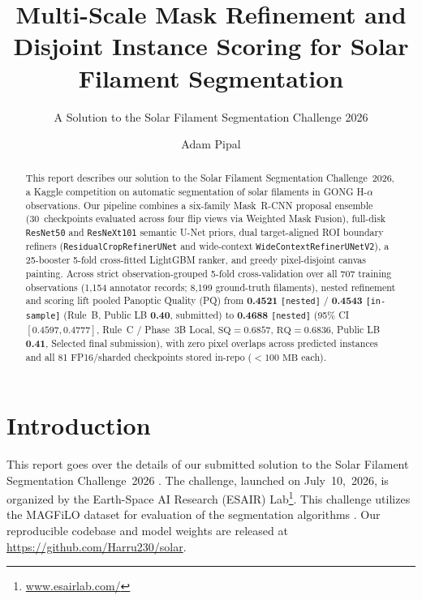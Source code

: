 \documentclass[sigconf]{acmart}
\begin{document}
\title{Multi-Scale Mask Refinement and Disjoint Instance Scoring for Solar Filament Segmentation}
\subtitle{A Solution to the Solar Filament Segmentation Challenge 2026} %


\author{Adam Pipal}

\begin{abstract}
    This report describes our solution to the Solar Filament Segmentation Challenge~2026, a Kaggle competition on automatic segmentation of solar filaments in GONG H-$\alpha$ observations. Our pipeline combines a six-family Mask~R-CNN proposal ensemble (30~checkpoints evaluated across four flip views via Weighted Mask Fusion), full-disk \texttt{ResNet50} and \texttt{ResNeXt101} semantic U-Net priors, dual target-aligned ROI boundary refiners (\texttt{ResidualCropRefinerUNet} and wide-context \texttt{WideContextRefinerUNetV2}), a 25-booster 5-fold cross-fitted LightGBM ranker, and greedy pixel-disjoint canvas painting. Across strict observation-grouped 5-fold cross-validation over all 707 training observations (1,154 annotator records; 8,199 ground-truth filaments), nested refinement and scoring lift pooled Panoptic Quality (PQ) from \textbf{0.4521} \texttt{[nested]} / \textbf{0.4543} \texttt{[in-sample]} (Rule~B, Public LB \textbf{0.40}, submitted) to \textbf{0.4688} \texttt{[nested]} (95\% CI $[0.4597, 0.4777]$, Rule~C / Phase~3B Local, $\text{SQ}=0.6857$, $\text{RQ}=0.6836$, Public LB \textbf{0.41}, Selected final submission), with zero pixel overlaps across predicted instances and all 81 FP16/sharded checkpoints stored in-repo ($<100\text{ MB}$ each).
\end{abstract}

\maketitle

\ifguideStyle
{}
\par\medskip
\fi

\section{Introduction}
    This report goes over the details of our submitted solution to the Solar Filament Segmentation Challenge~2026 \cite{filament-segmentation-2026}. The challenge, launched on July~10,~2026, is organized by the Earth-Space AI Research (ESAIR) Lab\footnote{\href{https://www.esairlab.com/home}{www.esairlab.com/}}. This challenge utilizes the MAGFiLO dataset for evaluation of the segmentation algorithms \cite{ahmadzadeh2024dataset}. Our reproducible codebase and model weights are released at \url{https://github.com/Harru230/solar}.
\end{document}
